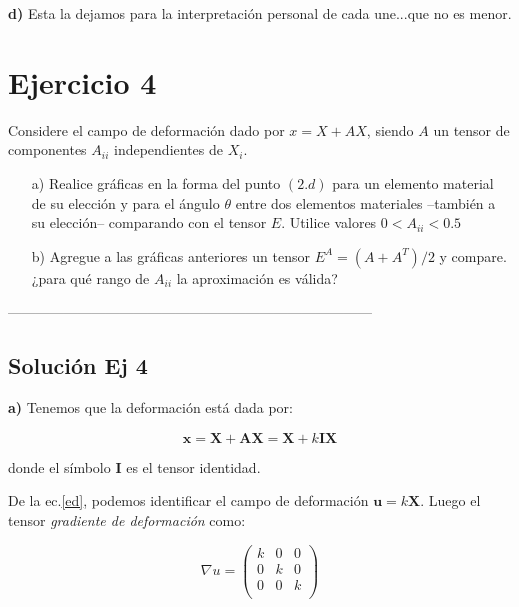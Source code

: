 \documentclass[10pt,a4paper]{article}
\begin{document}
\textbf{d)} Esta la dejamos para la interpretación personal de cada une...que no es menor.


\section*{Ejercicio 4}

Considere el campo de deformación dado por $x = X + AX$, siendo $A$ un tensor de componentes $A_{ii}$ independientes de $X_i$.
 
\begin{itemize}
\item[a)] Realice gráficas en la forma del punto $(2.d)$ para un elemento material de su elección y para el ángulo $\theta$ entre dos elementos materiales --también a su elección-- comparando con el tensor $E$. Utilice valores $0 < A_{ii} < 0.5$
\item[b)] Agregue a las gráficas anteriores un tensor $E^A = (A+A^T)/2$ y compare. ¿para qué rango de $A_{ii}$ la aproximación es válida?
\end{itemize}

\begin{center}------------------------------------------------------------------------------\end{center}

\subsection*{Solución Ej 4}

\textbf{a)} Tenemos que la deformación está dada por:

\begin{equation}\label{ed}
\mathbf{x} = \mathbf{X} + \mathbf{AX} = \mathbf{X} + k \mathbf{IX}
\end{equation}

\noindent donde el símbolo $\mathbf{I}$ es el tensor identidad.

De la ec.\eqref{ed}, podemos identificar el campo de deformación $\mathbf{u} = k \mathbf{X}$. Luego el tensor \textit{gradiente de deformación} como:

\begin{equation}\label{egdef}
\nabla u = 
\begin{pmatrix}
k &  0 & 0 \\ 
0 &  k & 0 \\ 
0 &  0 & k \\ 
\end{pmatrix}
\end{equation}
\end{document}
